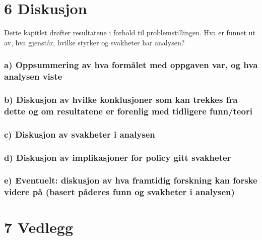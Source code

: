 \documentclass[
  12pt,
  a4paper,
  DIV=11,
  numbers=noendperiod]{scrartcl}
\begin{document}
\section{6 Diskusjon}\label{diskusjon}

Dette kapitlet drøfter resultatene i forhold til problemstillingen. Hva
er funnet ut av, hva gjenstår, hvilke styrker og svakheter har analysen?

\subsubsection{a) Oppsummering av hva formålet med oppgaven var, og hva
analysen
viste}\label{a-oppsummering-av-hva-formuxe5let-med-oppgaven-var-og-hva-analysen-viste}

\subsubsection{b) Diskusjon av hvilke konklusjoner som kan trekkes fra
dette og om resultatene er forenlig med tidligere
funn/teori}\label{b-diskusjon-av-hvilke-konklusjoner-som-kan-trekkes-fra-dette-og-om-resultatene-er-forenlig-med-tidligere-funnteori}

\subsubsection{c) Diskusjon av svakheter i
analysen}\label{c-diskusjon-av-svakheter-i-analysen}

\subsubsection{d) Diskusjon av implikasjoner for policy gitt
svakheter}\label{d-diskusjon-av-implikasjoner-for-policy-gitt-svakheter}

\subsubsection{e) Eventuelt: diskusjon av hva framtidig forskning kan
forske videre på (basert påderes funn og svakheter i
analysen)}\label{e-eventuelt-diskusjon-av-hva-framtidig-forskning-kan-forske-videre-puxe5-basert-puxe5deres-funn-og-svakheter-i-analysen}

\newpage

\section{7 Vedlegg}\label{vedlegg}
\end{document}
